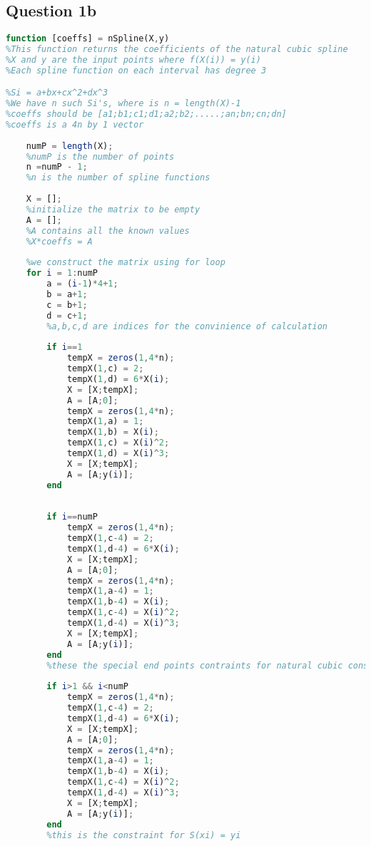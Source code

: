 \documentclass[11pt]{article} %
\begin{document}
\subsection{Question 1b}
\begin{lstlisting}[language=Octave]
function [coeffs] = nSpline(X,y)
%This function returns the coefficients of the natural cubic spline
%X and y are the input points where f(X(i)) = y(i)
%Each spline function on each interval has degree 3

%Si = a+bx+cx^2+dx^3
%We have n such Si's, where is n = length(X)-1
%coeffs should be [a1;b1;c1;d1;a2;b2;.....;an;bn;cn;dn]
%coeffs is a 4n by 1 vector
    
    numP = length(X);
    %numP is the number of points
    n =numP - 1;
    %n is the number of spline functions
    
    X = [];
    %initialize the matrix to be empty
    A = [];
    %A contains all the known values
    %X*coeffs = A
    
    %we construct the matrix using for loop
    for i = 1:numP
        a = (i-1)*4+1;
        b = a+1;
        c = b+1;
        d = c+1;
        %a,b,c,d are indices for the convinience of calculation
        
        if i==1
            tempX = zeros(1,4*n);
            tempX(1,c) = 2;
            tempX(1,d) = 6*X(i);
            X = [X;tempX];
            A = [A;0];
            tempX = zeros(1,4*n);
            tempX(1,a) = 1;
            tempX(1,b) = X(i);
            tempX(1,c) = X(i)^2;
            tempX(1,d) = X(i)^3;
            X = [X;tempX];
            A = [A;y(i)];
        end
        
        
        if i==numP
            tempX = zeros(1,4*n);
            tempX(1,c-4) = 2;
            tempX(1,d-4) = 6*X(i);
            X = [X;tempX];
            A = [A;0];
            tempX = zeros(1,4*n);
            tempX(1,a-4) = 1;
            tempX(1,b-4) = X(i);
            tempX(1,c-4) = X(i)^2;
            tempX(1,d-4) = X(i)^3;
            X = [X;tempX];
            A = [A;y(i)];
        end
        %these the special end points contraints for natural cubic constraint
        
        if i>1 && i<numP
            tempX = zeros(1,4*n);
            tempX(1,c-4) = 2;
            tempX(1,d-4) = 6*X(i);
            X = [X;tempX];
            A = [A;0];
            tempX = zeros(1,4*n);
            tempX(1,a-4) = 1;
            tempX(1,b-4) = X(i);
            tempX(1,c-4) = X(i)^2;
            tempX(1,d-4) = X(i)^3;
            X = [X;tempX];
            A = [A;y(i)];
        end
        %this is the constraint for S(xi) = yi
        

\end{lstlisting}
\end{document}
